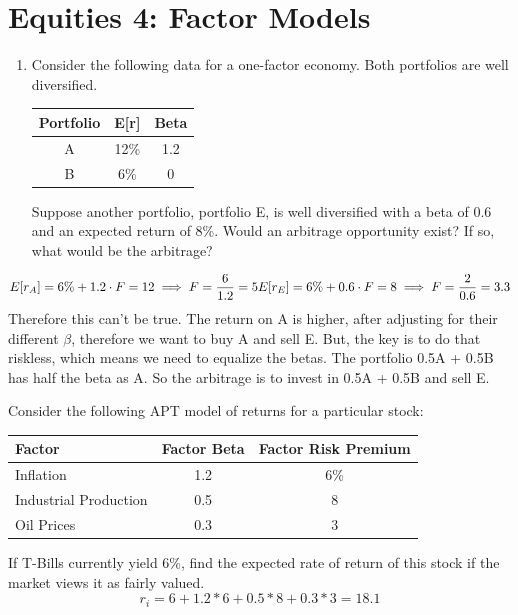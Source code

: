 \documentclass[11pt]{article}
\theoremstyle{definition}
\begin{document}
\section{Equities 4: Factor Models}

    \begin{shaded}
        \begin{enumerate}
            \item Consider the following data for a one-factor economy.   Both portfolios are 
            well diversified.
            
                \begin{tabular}{ccc}
                    \toprule
                    Portfolio & E[r] & Beta\\
                    \midrule
                    A & 12\% & 1.2\\
                    B & 6\% & 0\\
                    \bottomrule
                \end{tabular}

            Suppose another portfolio, portfolio E, is well diversified with a beta of 0.6 and 
            an expected return of 8\%.  Would an arbitrage opportunity exist?   If so, what would be the  arbitrage?
        \end{enumerate}
        \[ E[r_A] = 6\% + 1.2\cdot F = 12\\
            \implies F = \frac{6}{1.2} = 5 \\
            E[r_E] = 6\% + 0.6 \cdot F = 8 \\
            \implies F = \frac{2}{0.6} = 3.3 \\
        \]
        Therefore this can't be true.  The return on A is higher, after adjusting for their different $\beta$, therefore we want to buy A and sell E.   But, the key is to do that riskless, which means we need to equalize the betas.   The portfolio 0.5A + 0.5B has half the beta as A.   So the arbitrage is to invest in 0.5A + 0.5B and sell E.
        
    \end{shaded}

    \begin{shaded}
    Consider the following APT model of returns for a particular stock:
        \begin{table}
            \begin{tabular}{lcc}
                \toprule
                Factor & Factor Beta & Factor Risk Premium \\
                \midrule
                Inflation   & 1.2 & 6\%\\
                Industrial Production & 0.5 & 8\\
                Oil Prices & 0.3 & 3\\
                \bottomrule
            \end{tabular}
        \end{table}
    If T-Bills currently yield 6\%, find the expected rate of return of this stock if the market 
    views it as fairly valued.\\
    \[
    r_i = 6 + 1.2*6 + 0.5*8 + 0.3*3 = 18.1
    \]
    \end{shaded}
\end{document}

